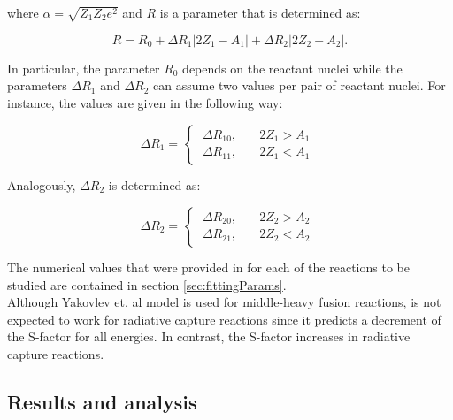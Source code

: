 \documentclass[openany]{book}
\begin{document}
where $\alpha = \sqrt{Z_1Z_2e^2}$ and $R$ is a parameter that is determined as:

\begin{equation} \label{eq:potential_Yakovlev_R}
	R = R_0 + \Delta R_{1} |2Z_1 - A_1| + \Delta R_{2}|2Z_2 - A_2|.
\end{equation}

In particular, the parameter $R_0$ depends on the reactant nuclei while the parameters $\Delta R_{1}$ and $\Delta R_{2}$ can assume two values per pair of reactant nuclei. For instance, the values are given in the following way: 

\begin{equation} \label{eq:potential_Yakovlev_R1}
	\Delta R_1= 	\left\{\begin{array}{l}
		\begin{split}
			\Delta R_{10}, \quad & 2Z_1 > A_1\\ 
			\Delta R_{11}, \quad & 2Z_1 < A_1
		\end{split}
	\end{array}\right.
\end{equation}

Analogously, $\Delta R_2$ is determined as: 

\begin{equation} \label{eq:potential_Yakovlev_R2}
	\Delta R_2= 	\left\{\begin{array}{l}
		\begin{split}
			\Delta R_{20}, \quad & 2Z_2 > A_2\\ 
			\Delta R_{21}, \quad & 2Z_2 < A_2
		\end{split}
	\end{array}\right.
\end{equation}

The numerical values that were provided in \cite{yakovlev_beard_gasques_wiescher_2010} for each of the reactions to be studied are contained in section \ref{sec:fittingParams}. \\

Although Yakovlev et. al model is used for middle-heavy fusion reactions, is not expected to work for radiative capture reactions since it predicts a decrement of the S-factor for all energies. In contrast, the S-factor increases in radiative capture reactions.  \\


\subsection{Results and analysis} \label{sub:resultsAnalysisNonResonant}
\end{document}
